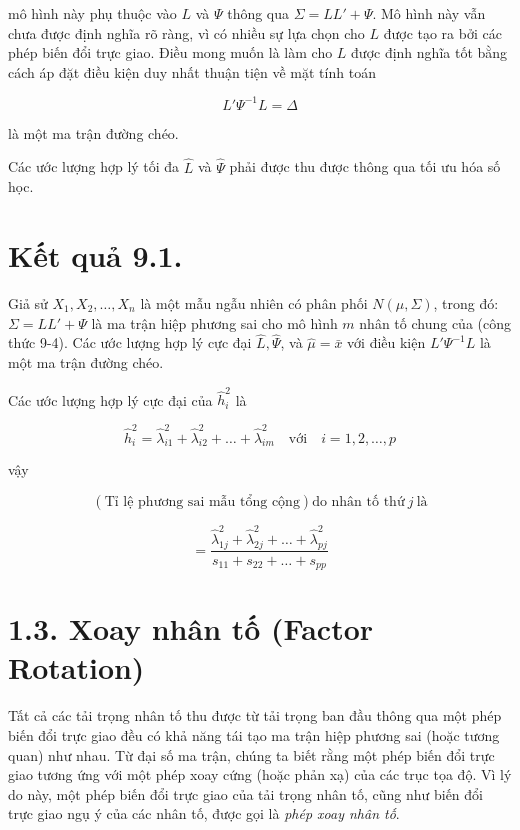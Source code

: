 \documentclass{article}
\begin{document}
mô hình này phụ thuộc vào \( L \) và \( \Psi \) thông qua \( \Sigma = LL' + \Psi \). Mô hình này vẫn chưa được định nghĩa rõ ràng, vì có nhiều sự lựa chọn cho \( L \) được tạo ra bởi các phép biến đổi trực giao. Điều mong muốn là làm cho \( L \) được định nghĩa tốt bằng cách áp đặt điều kiện duy nhất thuận tiện về mặt tính toán

\[
L'\Psi^{-1}L = \Delta
\]

là một ma trận đường chéo.

Các ước lượng hợp lý tối đa \( \hat{L} \) và \( \hat{\Psi} \) phải được thu được thông qua tối ưu hóa số học.

\section*{Kết quả 9.1.}
Giả sử \( X_1, X_2, \dots, X_n \) là một mẫu ngẫu nhiên có phân phối \( N(\mu, \Sigma) \), trong đó:  \( \Sigma = LL' + \Psi \) là ma trận hiệp phương sai cho mô hình \( m \) nhân tố chung của (công thức 9-4). Các ước lượng hợp lý cực đại \( \hat{L}, \hat{\Psi} \), và \( \hat{\mu} = \bar{x} \) với điều kiện \( L'\Psi^{-1}L \) là một ma trận đường chéo.

Các ước lượng hợp lý cực đại của \(\hat{h}_i^2\) là

\begin{equation}
\hat{h}_i^2 = \hat{\lambda}_{i1}^2 + \hat{\lambda}_{i2}^2 + \dots + \hat{\lambda}_{im}^2 \quad \text{với} \quad i = 1, 2, \dots, p
\end{equation}

vậy

\begin{equation}
\left( \text{Tỉ lệ phương sai mẫu tổng cộng} \right) \text{do nhân tố thứ} \ j \ \text{là}
\end{equation}

\begin{equation}
= \frac{\hat{\lambda}_{1j}^2 + \hat{\lambda}_{2j}^2 + \dots + \hat{\lambda}_{pj}^2}{s_{11} + s_{22} + \dots + s_{pp}}
\end{equation}


\section* {1.3. Xoay nhân tố (Factor Rotation)}
Tất cả các tải trọng nhân tố thu được từ tải trọng ban đầu thông qua một phép biến đổi trực giao đều có khả năng tái tạo ma trận hiệp phương sai (hoặc tương quan) như nhau. Từ đại số ma trận, chúng ta biết rằng một phép biến đổi trực giao tương ứng với một phép xoay cứng (hoặc phản xạ) của các trục tọa độ. Vì lý do này, một phép biến đổi trực giao của tải trọng nhân tố, cũng như biến đổi trực giao ngụ ý của các nhân tố, được gọi là \textit{phép xoay nhân tố}.
\end{document}
